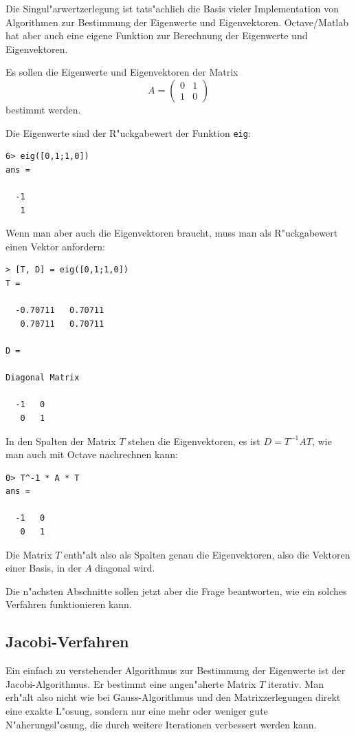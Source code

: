 Die Singul"arwertzerlegung ist tats"achlich die Basis vieler Implementation
von Algorithmen zur Bestimmung der Eigenwerte und Eigenvektoren.
Octave/Matlab hat aber auch eine eigene Funktion zur Berechnung der
Eigenwerte und Eigenvektoren.
\begin{beispiel}
Es sollen die Eigenwerte und Eigenvektoren der Matrix
\[
A=\begin{pmatrix}0&1\\1&0\end{pmatrix}
\]
bestimmt werden.

Die Eigenwerte sind der R"uckgabewert der Funktion {\tt eig}:
\begin{verbatim}
6> eig([0,1;1,0])
ans =

  -1
   1
\end{verbatim}
Wenn man aber auch die Eigenvektoren braucht, muss man als R"uckgabewert
einen Vektor anfordern:
\begin{verbatim}
> [T, D] = eig([0,1;1,0])
T =

  -0.70711   0.70711
   0.70711   0.70711

D =

Diagonal Matrix

  -1   0
   0   1
\end{verbatim}
In den Spalten der Matrix $T$ stehen die Eigenvektoren, es ist
$D=T^{-1}AT$, wie man auch mit Octave nachrechnen kann:
\begin{verbatim}
0> T^-1 * A * T
ans =

  -1   0
   0   1
\end{verbatim}
Die Matrix $T$ enth"alt also als Spalten genau die Eigenvektoren,
also die Vektoren einer Basis, in der $A$ diagonal wird.
\end{beispiel}
Die n"achsten Abschnitte sollen jetzt aber die Frage beantworten,
wie ein solches Verfahren funktionieren kann.

\subsection{Jacobi-Verfahren}
Ein einfach zu verstehender Algorithmus zur Bestimmung der Eigenwerte
ist der Jacobi-Algorithmus.
Er bestimmt eine angen"aherte Matrix $T$ iterativ.
Man erh"alt also nicht wie bei Gauss-Algorithmus und
den Matrixzerlegungen direkt eine exakte L"osung, sondern nur eine
mehr oder weniger gute N"aherungsl"osung, die durch weitere Iterationen
verbessert werden kann.

